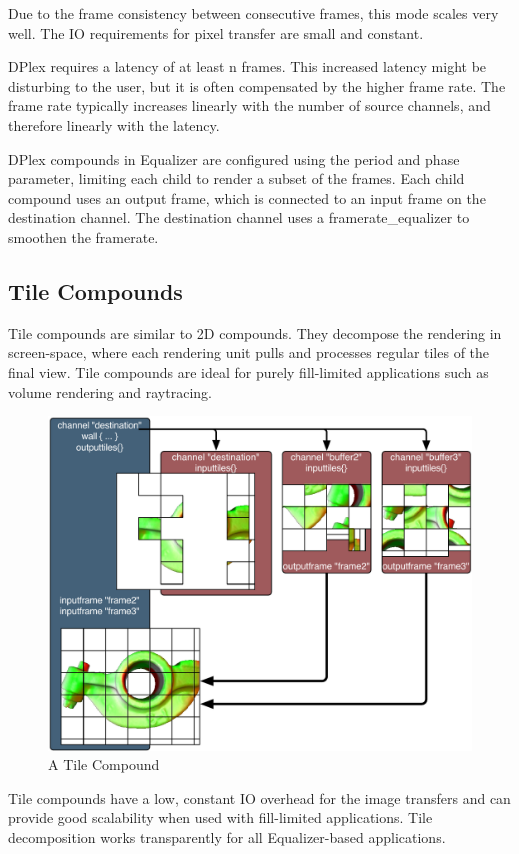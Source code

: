 \documentclass[10pt,a4]{scrartcl}
\begin{document}
Due to the frame consistency between consecutive frames, this mode scales
very well. The IO requirements for pixel transfer are small and
constant.

DPlex requires a latency of at least n frames. This increased latency
might be disturbing to the user, but it is often compensated by the
higher frame rate. The frame rate typically increases linearly with the
number of source channels, and therefore linearly with the latency.

DPlex compounds in Equalizer are configured using the \textsf{period}
and \textsf{phase} parameter, limiting each child to render a subset of
the frames. Each child compound uses an output frame, which is connected
to an input frame on the destination channel. The destination channel
uses a \textsf{framerate\_equalizer} to smoothen the framerate.


\subsection{\label{sTileCompunds}Tile Compounds}

Tile compounds are similar to 2D compounds. They decompose the rendering in
screen-space, where each rendering unit pulls and processes regular tiles of the
final view. Tile compounds are ideal for purely fill-limited applications such
as volume rendering and raytracing.

\begin{figure}
  \includegraphics[width=.618\textwidth]{images/tile.pdf}
  {\caption{\label{fTile}\small A Tile Compound}}
\end{figure}
Tile compounds have a low, constant IO overhead for the image transfers and can
provide good scalability when used with fill-limited applications. Tile
decomposition works transparently for all Equalizer-based applications.
\end{document}
